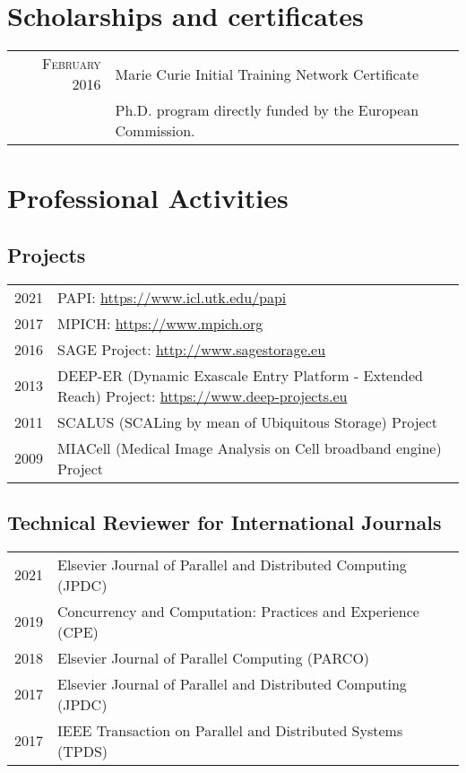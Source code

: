 \documentclass[a4paper,10pt]{article}
\begin{document}
\section{Scholarships and certificates}
\begin{tabular}{rp{11cm}}
\textsc{February} 2016 & Marie Curie Initial Training Network Certificate \\
          & \footnotesize{Ph.D. program directly funded by the European Commission.}
\end{tabular}

\section{Professional Activities}
\subsection*{Projects}
\begin{tabular}{p{1.45cm}p{11cm}}
    2021 & PAPI: \url{https://www.icl.utk.edu/papi} \\
    2017 & MPICH: \url{https://www.mpich.org} \\
    2016 & SAGE Project: \url{http://www.sagestorage.eu} \\
    2013 & DEEP-ER (Dynamic Exascale Entry Platform - Extended Reach) Project: \url{https://www.deep-projects.eu} \\
    2011 & SCALUS (SCALing by mean of Ubiquitous Storage) Project \\
    2009 & MIACell (Medical Image Analysis on Cell broadband engine) Project \\
\end{tabular}

\subsection*{Technical Reviewer for International Journals}
\begin{tabular}{p{1.45cm}p{11cm}}
    2021 & Elsevier Journal of Parallel and Distributed Computing (JPDC) \\
    2019 & Concurrency and Computation: Practices and Experience (CPE) \\
    2018 & Elsevier Journal of Parallel Computing (PARCO) \\
    2017 & Elsevier Journal of Parallel and Distributed Computing (JPDC)\\
    2017 & IEEE Transaction on Parallel and Distributed Systems (TPDS)\\
\end{tabular}
\end{document}
